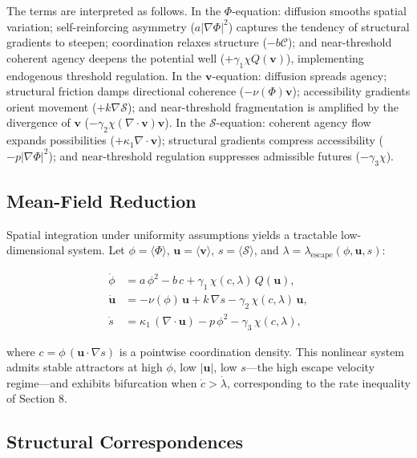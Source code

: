 \documentclass[11pt, a4paper]{article}
\begin{document}
The terms are interpreted as follows. In the $\Phi$-equation: diffusion smooths spatial variation; self-reinforcing asymmetry ($a|\nabla\Phi|^2$) captures the tendency of structural gradients to steepen; coordination relaxes structure ($-b\mathcal{C}$); and near-threshold coherent agency deepens the potential well ($+\gamma_1 \chi Q(\mathbf{v})$), implementing endogenous threshold regulation. In the $\mathbf{v}$-equation: diffusion spreads agency; structural friction damps directional coherence ($-\nu(\Phi)\mathbf{v}$); accessibility gradients orient movement ($+k\nabla\mathcal{S}$); and near-threshold fragmentation is amplified by the divergence of $\mathbf{v}$ ($-\gamma_2 \chi (\nabla\cdot\mathbf{v})\mathbf{v}$). In the $\mathcal{S}$-equation: coherent agency flow expands possibilities ($+\kappa_1 \nabla\cdot\mathbf{v}$); structural gradients compress accessibility ($-p|\nabla\Phi|^2$); and near-threshold regulation suppresses admissible futures ($-\gamma_3 \chi$).

\subsection{Mean-Field Reduction}

Spatial integration under uniformity assumptions yields a tractable low-dimensional system. Let $\phi = \langle\Phi\rangle$, $\mathbf{u} = \langle\mathbf{v}\rangle$, $s = \langle\mathcal{S}\rangle$, and $\lambda = \lambda_{\mathrm{escape}}(\phi,\mathbf{u},s)$:

\begin{align}
\dot{\phi} &= a\,\phi^2 - b\,c + \gamma_1\,\chi(c,\lambda)\,Q(\mathbf{u}), \\
\dot{\mathbf{u}} &= -\nu(\phi)\,\mathbf{u} + k\,\nabla s - \gamma_2\,\chi(c,\lambda)\,\mathbf{u}, \\
\dot{s} &= \kappa_1\,(\nabla\cdot\mathbf{u}) - p\,\phi^2 - \gamma_3\,\chi(c,\lambda),
\end{align}

where $c = \phi\,(\mathbf{u}\cdot\nabla s)$ is a pointwise coordination density. This nonlinear system admits stable attractors at high $\phi$, low $|\mathbf{u}|$, low $s$---the high escape velocity regime---and exhibits bifurcation when $\dot{c} > \dot{\lambda}$, corresponding to the rate inequality of Section 8.

\subsection{Structural Correspondences}
\end{document}
